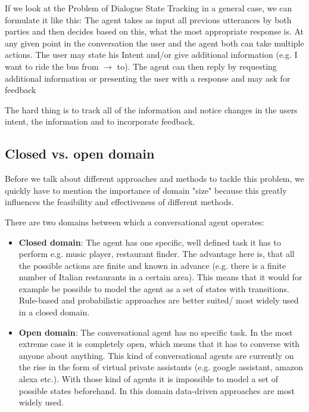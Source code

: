 \documentclass[conference]{IEEEtran}
\begin{document}
If we look at the Problem of Dialogue State Tracking in a general case, we can formulate it like this:
The agent takes as input all previous utterances by both parties and then decides based on this, what the most appropriate response is.
At any given point in the conversation the user and the agent both can take multiple actions. 
The user may state his Intent and/or give additional information (e.g. I want to ride the bus from $\rightarrow$ to). The agent can then reply by requesting additional information or presenting the user with a response and may ask for feedback

The hard thing is to track all of the information and notice changes in the users intent, the information and to incorporate feedback.

\subsection{Closed vs. open domain}
Before we talk about different approaches and methods to tackle this problem, we quickly have to mention the importance of domain "size" because this greatly influences the feasibility and effectiveness of different methods.

There are two domains\cite{yan2016shall} between which a conversational agent operates:
\begin{itemize}
\item{\textbf{Closed domain}: The agent has one specific, well defined task it has to perform e.g. music player, restaurant finder. The advantage here is, that all the possible actions are finite and known in advance\cite{radlinski2017theoretical} (e.g. there is a finite number of Italian restaurants in a certain area). This means that it would for example be possible to model the agent as a set of states with transitions. Rule-based and probabilistic approaches are better suited/ most widely used in a closed domain.}
\item{\textbf{Open domain}: The conversational agent has no specific task. In the most extreme case it is completely open, which means that it has to converse with anyone about anything. This kind of conversational agents are currently on the rise in the form of virtual private 	assistants (e.g. google assistant, amazon alexa etc.)\cite{klopfenstein2017rise}. With those kind of agents it is impossible to model a set of possible states beforehand. In this domain data-driven approaches are most widely used.}
\end{itemize}
\end{document}
